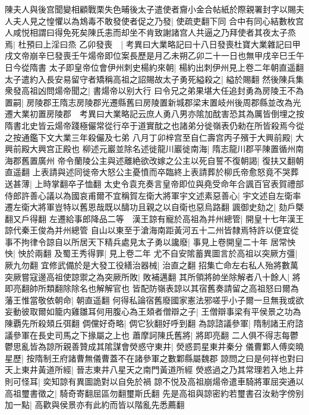 陳夫人與後宫聞變相顧戰栗失色晡後太子遣使者齎小金合帖紙於際親署封字以賜夫人夫人見之惶懼以為鴆毒不敢發使者促之乃發|{
	使疏吏翻下同}
合中有同心結數枚宫人咸悦相謂曰得免死矣陳氏恚而却坐不肯致謝諸宫人共逼之乃拜使者其夜太子烝焉|{
	杜預曰上淫曰烝}
乙卯發喪　|{
	考異曰大業略記曰十八日發喪杜寶大業雜記曰甲戌文帝崩辛巳發喪壬午煬帝即位案長歷是月乙未朔乙卯二十一日也無甲戌辛巳壬午日今從隋書}
太子即皇帝位會伊州刺史楊約來朝|{
	楊約出刺伊州見上卷二年朝直遥翻}
太子遣約入長安易留守者矯稱高祖之詔賜故太子勇死縊殺之|{
	縊於賜翻}
然後陳兵集衆發高祖凶問煬帝聞之|{
	書煬帝以别大行}
曰令兄之弟果堪大任追封勇為房陵王不為置嗣|{
	房陵郡王隋志房陵郡光遷縣舊曰房陵置新城郡梁末置岐州後周郡縣並改為光遷大業初置房陵郡　考異曰大業略記云庶人勇八男亦隂加酖害恐其為厲皆倒埋之按隋書北史皆云煬帝踐極儼常從行卒于道實酖之也諸弟分徙嶺表仍勑在所皆殺焉今從之按通鑑下文大業三年殺儼及七弟}
八月丁卯梓宫至自仁壽宫丙子殯于大興前殿|{
	大興前殿大興宫正殿也}
柳述元巖並除名述徙龍川巖徙南海|{
	隋志龍川郡平陳置循州南海郡舊置廣州}
帝令蘭陵公主與述離絶欲改嫁之公主以死自誓不復朝謁|{
	復扶又翻朝直遥翻}
上表請與述同徙帝大怒公主憂憤而卒臨終上表請葬於柳氏帝愈怒竟不哭葬送甚薄|{
	上時掌翻卒子恤翻}
太史令袁充奏言皇帝即位與堯受命年合諷百官表賀禮部侍郎許善心議以為國哀甫爾不宜稱賀左衛大將軍宇文述素惡善心|{
	宇文述自左衛率遷左衛大將軍豈特以舊恩哉既以醻功且親之以自衛也惡烏路翻}
諷御史劾之|{
	劾戶槩翻又戶得翻}
左遷給事郎降品二等　漢王諒有寵於高祖為并州總管|{
	開皇十七年漢王諒代秦王俊為并州總管}
自山以東至于滄海南距黃河五十二州皆隸焉特許以便宜從事不拘律令諒自以所居天下精兵處見太子勇以讒廢|{
	事見上卷開皇二十年}
居常怏怏|{
	怏於兩翻}
及蜀王秀得罪|{
	見上卷二年}
尤不自安隂蓄異圖言於高祖以突厥方彊|{
	厥九勿翻}
宜修武備於是大發工役繕治器械|{
	治直之翻}
招集亡命左右私人殆將數萬突厥嘗寇邊高祖使諒禦之為突厥所敗|{
	敗補邁翻}
其所領將帥坐除解者八十餘人|{
	將即亮翻帥所類翻除除名也解解官也}
皆配防嶺表諒以其宿舊奏請留之高祖怒曰爾為藩王惟當敬依朝命|{
	朝直遥翻}
何得私論宿舊廢國家憲法邪嗟乎小子爾一旦無我或欲妄動彼取爾如籠内雞雛耳何用腹心為王頍者僧辯之子|{
	王僧辯事梁有平侯景之功為陳覇先所殺頍丘弭翻}
倜儻好奇略|{
	倜它狄翻好呼到翻}
為諒諮議參軍|{
	隋制諸王府諮議參軍在長史司馬之下掾屬之上也}
蕭摩訶陳氏舊將|{
	將即亮翻}
二人俱不得志每鬱鬱思亂皆為諒所親善贊成其隂謀會熒惑守東井|{
	熒惑罰星東井秦分}
儀曹鄴人傅奕曉星歷|{
	按隋制王府諸曹無儀曹蓋不在諸參軍之數鄴縣屬魏郡}
諒問之曰是何祥也對曰天上東井黃道所經|{
	晉志東井八星天之南門黃道所經}
熒惑過之乃其常理若入地上井則可怪耳|{
	奕知諒有異圖詭對以自免於禍}
諒不悦及高祖崩煬帝遣車騎將軍屈突通以高祖璽書徵之|{
	騎奇寄翻屈區勿翻璽斯氏翻}
先是高祖與諒密約若璽書召汝勑字傍别加一點|{
	高歡與侯景亦有此約而皆以階亂先悉薦翻}
